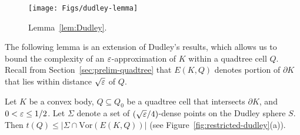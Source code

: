 \documentclass[11pt]{article}   \usepackage[letterpaper,hmargin=2.1cm,vmargin=3cm]{geometry}
\newcommand{\Vor}{\mathrm{Vor}}
\begin{document}
\begin{figure}[htbp]
  \centerline{\texttt{[image: Figs/dudley-lemma]}}
  \caption{Lemma~\ref{lem:Dudley}.}
  \label{fig:dudley-lemma}
\end{figure}


The following lemma is an extension of Dudley's results, which allows us to bound the complexity of an $\varepsilon$-approximation of $K$ within a quadtree cell $Q$. Recall from Section~\ref{sec:prelim-quadtree} that $E(K,Q)$ denotes portion of $\partial K$ that lies within distance $\sqrt{\varepsilon}$ of $Q$. 

\begin{lemma} \label{lem:restricted-dudley}
Let $K$ be a convex body, $Q \subseteq Q_0$ be a quadtree cell that intersects $\partial K$, and $0 < \varepsilon \le 1/2$. Let $\Sigma$ denote a set of $(\sqrt{\varepsilon}/4)$-dense points on the Dudley sphere $S$. Then $t(Q) \le |\Sigma \cap \Vor(E(K,Q))|$ (see Figure~\ref{fig:restricted-dudley}(a)).
\end{lemma}
\end{document}
